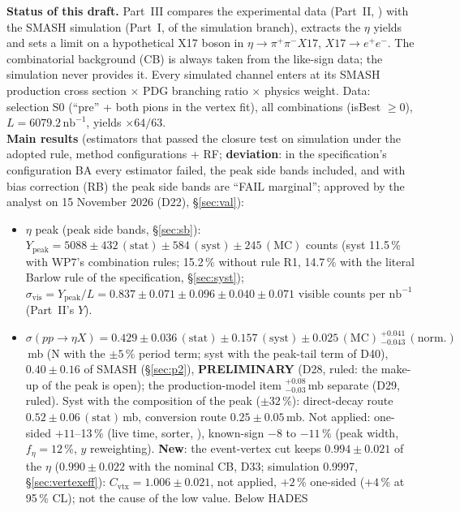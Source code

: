 \documentclass[11pt,a4paper]{article}
\newcommand{\ee}{\ensuremath{e^{+}e^{-}}\xspace}
\newcommand{\pipi}{\ensuremath{\pi^{+}\pi^{-}}\xspace}
\newcommand{\nbinv}{\ensuremath{\mathrm{nb}^{-1}}\xspace}
\newcommand{\code}[1]{\texttt{\detokenize{#1}}}
\newcommand{\Ypeak}{\ensuremath{Y_{\mathrm{peak}}}\xspace}
\newcommand{\feta}{\ensuremath{f_\eta}\xspace}
\newcommand{\sigeta}{\ensuremath{\sigma(pp\to\eta X)}\xspace}
\newcommand{\notebox}[1]{\par\noindent\colorbox{orange!10}{\parbox{\dimexpr\linewidth-2\fboxsep\relax}{#1}}\par}
\begin{document}
\notebox{\textbf{Status of this draft.} Part~III compares the experimental data (Part~II, \code{report_exp.pdf}) with the
SMASH simulation (Part~I, \code{report_sim.pdf} of the simulation branch), extracts the $\eta$ yields and sets a limit on a hypothetical
X17 boson in $\eta\to\pipi X17$, $X17\to\ee$. The combinatorial background (CB) is always taken from the like-sign data; the
simulation never provides it. Every simulated channel enters at its SMASH production cross section $\times$ PDG branching ratio
$\times$ physics weight. Data: selection S0 (``pre'' + both pions in the vertex fit), all combinations (isBest $\ge0$),
$L=6079.2\,\nbinv$, yields $\times64/63$.\\[0.3em]
\textbf{Main results} (estimators that passed the closure test on simulation under the adopted rule, method configurations + RF;
\textbf{deviation}: in the specification's configuration BA every estimator failed, the peak side bands included, and with bias correction
(RB) the peak side bands are ``FAIL marginal''; approved by the analyst on 15 November 2026 (D22), \S\ref{sec:val}):
\begin{itemize}\setlength{\itemsep}{0pt}
\item $\eta$ peak (peak side bands, \S\ref{sec:sb}): $\Ypeak = 5088\pm432\,(\mathrm{stat})\pm584\,(\mathrm{syst})\pm245\,(\mathrm{MC})$
      counts (syst 11.5\,\% with WP7's combination rules; 15.2\,\% without rule R1, 14.7\,\% with the literal Barlow rule of the
      specification, \S\ref{sec:syst}); $\sigma_{\mathrm{vis}}=\Ypeak/L=0.837\pm0.071\pm0.096\pm0.040\pm0.071$ visible counts per \nbinv (Part~II's $Y$).
\item $\sigeta = 0.429\pm0.036\,(\mathrm{stat})\pm0.157\,(\mathrm{syst})\pm0.025\,(\mathrm{MC})\,^{+0.041}_{-0.043}\,(\mathrm{norm.})$\,mb (N with the $\pm5$\,\% period term;
      syst with the peak-tail term of D40), $0.40\pm0.16$ of SMASH (\S\ref{sec:p2}), \textbf{PRELIMINARY} (D28, ruled: the make-up of the peak is open); the production-model item
      $^{+0.08}_{-0.03}$\,mb separate (D29, ruled). Syst with the composition of the peak
      ($\pm32$\,\%): direct-decay route $0.52\pm0.06\,(\mathrm{stat})$\,mb, conversion route $0.25\pm0.05$\,mb. Not applied: one-sided $+11$--13\,\%
      (live time, sorter, \code{cor_ok}), known-sign $-8$ to $-11$\,\% (peak width, $\feta=12$\,\%, $y$ reweighting). \textbf{New}: the event-vertex
      cut keeps $0.994\pm0.021$ of the $\eta$ ($0.990\pm0.022$ with the nominal CB, D33; simulation 0.9997, \S\ref{sec:vertexeff}):
      $C_{\mathrm{vtx}}=1.006\pm0.021$, not applied, $+2$\,\% one-sided ($+4$\,\% at 95\,\% CL); not the cause of the low value. Below HADES

\end{itemize}}
\end{document}
